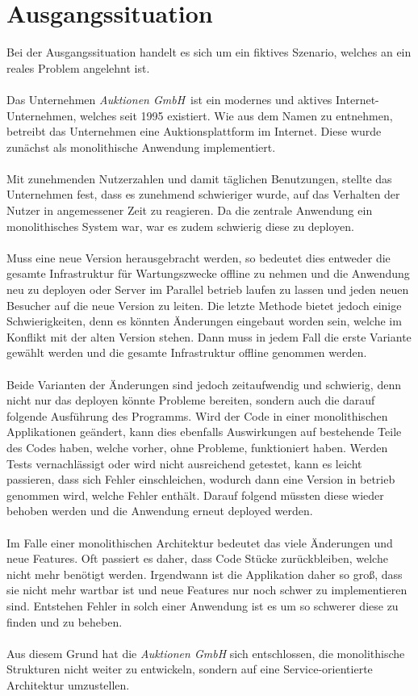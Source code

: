 \section{Ausgangssituation}
\label{sec:ausgangssituation}
Bei der Ausgangssituation handelt es sich um ein fiktives Szenario, welches an ein reales Problem angelehnt ist.
\\\\
Das Unternehmen \textit{Auktionen GmbH}\ ist ein modernes und aktives Internet-Unternehmen, welches seit 1995 existiert. Wie aus dem Namen zu entnehmen, betreibt das Unternehmen eine Auktionsplattform im Internet. Diese wurde zunächst als monolithische Anwendung implementiert.
\\\\
Mit zunehmenden Nutzerzahlen und damit täglichen Benutzungen, stellte das Unternehmen fest, dass es zunehmend schwieriger wurde, auf das Verhalten der Nutzer in angemessener Zeit zu reagieren. Da die zentrale Anwendung ein monolithisches System war, war es zudem schwierig diese zu deployen.
\\\\
Muss eine neue Version herausgebracht werden, so bedeutet dies entweder die gesamte Infrastruktur für Wartungszwecke offline zu nehmen und die Anwendung neu zu deployen oder Server im Parallel betrieb laufen zu lassen und jeden neuen Besucher auf die neue Version zu leiten. Die letzte Methode bietet jedoch einige Schwierigkeiten, denn es könnten Änderungen eingebaut worden sein, welche im Konflikt mit der alten Version stehen. Dann muss in jedem Fall die erste Variante gewählt werden und die gesamte Infrastruktur offline genommen werden.
\\\\
Beide Varianten der Änderungen sind jedoch zeitaufwendig und schwierig, denn nicht nur das deployen könnte Probleme bereiten, sondern auch die darauf folgende Ausführung des Programms. Wird der Code in einer monolithischen Applikationen geändert, kann dies ebenfalls Auswirkungen auf bestehende Teile des Codes haben, welche vorher, ohne Probleme, funktioniert haben. Werden Tests vernachlässigt oder wird nicht ausreichend getestet, kann es leicht passieren, dass sich Fehler einschleichen, wodurch dann eine Version in betrieb genommen wird, welche Fehler enthält. Darauf folgend müssten diese wieder behoben werden und die Anwendung erneut deployed werden.
\\\\
Im Falle einer monolithischen Architektur bedeutet das viele Änderungen und neue Features. Oft passiert es daher, dass Code Stücke zurückbleiben, welche nicht mehr benötigt werden. Irgendwann ist die Applikation daher so groß, dass sie nicht mehr wartbar ist und neue Features nur noch schwer zu implementieren sind. Entstehen Fehler in solch einer Anwendung ist es um so schwerer diese zu finden und zu beheben.
\\\\
Aus diesem Grund hat die \textit{Auktionen GmbH} sich entschlossen, die monolithische Strukturen nicht weiter zu entwickeln, sondern auf eine Service-orientierte Architektur umzustellen.

